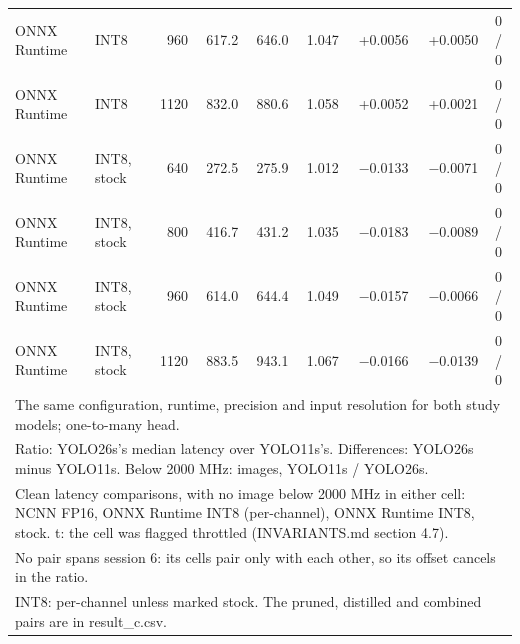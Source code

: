 \begin{tabular}{llrrrrrrc}
ONNX Runtime & INT8 & 960 & 617.2 & 646.0 & 1.047 & +0.0056 & +0.0050 & 0 / 0 \\
ONNX Runtime & INT8 & 1120 & 832.0 & 880.6 & 1.058 & +0.0052 & +0.0021 & 0 / 0 \\
ONNX Runtime & INT8, stock & 640 & 272.5 & 275.9 & 1.012 & $-$0.0133 & $-$0.0071 & 0 / 0 \\
ONNX Runtime & INT8, stock & 800 & 416.7 & 431.2 & 1.035 & $-$0.0183 & $-$0.0089 & 0 / 0 \\
ONNX Runtime & INT8, stock & 960 & 614.0 & 644.4 & 1.049 & $-$0.0157 & $-$0.0066 & 0 / 0 \\
ONNX Runtime & INT8, stock & 1120 & 883.5 & 943.1 & 1.067 & $-$0.0166 & $-$0.0139 & 0 / 0 \\
\bottomrule
\multicolumn{9}{l}{\footnotesize The same configuration, runtime, precision and input resolution for both study models; one-to-many head.} \\
\multicolumn{9}{l}{\footnotesize Ratio: YOLO26s's median latency over YOLO11s's. Differences: YOLO26s minus YOLO11s. Below 2000 MHz: images, YOLO11s / YOLO26s.} \\
\multicolumn{9}{l}{\footnotesize Clean latency comparisons, with no image below 2000 MHz in either cell: NCNN FP16, ONNX Runtime INT8 (per-channel), ONNX Runtime INT8, stock. t: the cell was flagged throttled (INVARIANTS.md section 4.7).} \\
\multicolumn{9}{l}{\footnotesize No pair spans session 6: its cells pair only with each other, so its offset cancels in the ratio.} \\
\multicolumn{9}{l}{\footnotesize INT8: per-channel unless marked stock. The pruned, distilled and combined pairs are in result\_c.csv.} \\
\end{tabular}
